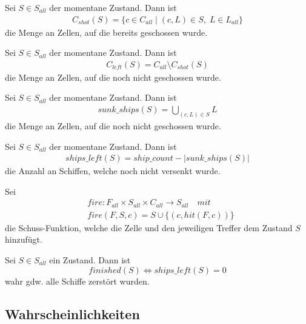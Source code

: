 \documentclass[a4paper,12pt]{llncs}
\numberwithin{equation}{section}
\begin{document}
\begin{definition}
Sei $S\in S_{all}$ der momentane Zustand.
Dann ist
\begin{align}
C_{shot}(S)=\{c \in C_{all} \mid (c,L) \in S, \; L \in L_{all}\}
\end{align}
 die Menge an Zellen, auf die bereits geschossen wurde.
\end{definition}

\begin{definition}
Sei $S\in S_{all}$ der momentane Zustand.
Dann ist 
\begin{align}
C_{left}(S)=C_{all} \setminus C_{shot}(S)
\end{align}
die Menge an Zellen, auf die noch nicht geschossen wurde.
\end{definition}

\begin{definition}
Sei $S\in S_{all}$ der momentane Zustand.
Dann ist 
\begin{align}
sunk\_ships(S)=\bigcup_{(c,L) \in S} L
\end{align}
die Menge an Zellen, auf die noch nicht geschossen wurde.
\end{definition}

\begin{definition}
Sei $S\in S_{all}$ der momentane Zustand.
Dann ist 
\begin{align}
ships\_left(S)=ship\_count - |sunk\_ships(S)|
\end{align}
die Anzahl an Schiffen, welche noch nicht versenkt wurde.
\end{definition}

\begin{definition}
Sei
\begin{align}
&fire:F_{all}\times S_{all}\times C_{all} \rightarrow S_{all} \quad mit \nonumber\\
&fire(F, S, c)=S \cup \{(c,hit(F, c))\}  \nonumber
\end{align}
die Schuss-Funktion, welche die Zelle und den jeweiligen Treffer dem Zustand $S$ hinzufügt.
\end{definition}

\begin{definition}
Sei $S\in S_{all}$ ein Zustand.
Dann ist
\[
finished(S) \Leftrightarrow ships\_left(S)=0
\]
wahr gdw. alle Schiffe zerstört wurden.
\end{definition}

\subsection{Wahrscheinlichkeiten}
\end{document}
